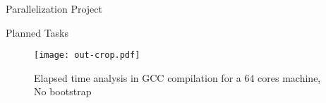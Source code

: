 \begin{section}{Parallelization Project}
\begin{subsection}{Planned Tasks}
\begin{figure}[ht]
 \centering
 \texttt{[image: out-crop.pdf]}
 \caption{Elapsed time analysis in GCC compilation for a 64 cores machine, No bootstrap}
 \label{fig:analysis}
\end{figure}

\end{subsection}

\end{section}

